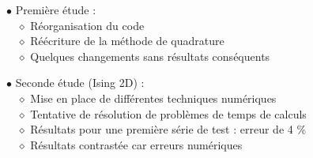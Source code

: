 \documentclass[9pt]{beamer}
\begin{document}
		\begin{frame}
	\justifying
	\vspace*{22pt}
	
	$\bullet$ Première étude : \\
	\vspace*{5pt}
		$\quad \diamond$ Réorganisation du code \\
		$\quad \diamond$ Réécriture de la méthode de quadrature \\
		$\quad \diamond$ Quelques changements sans résultats conséquents\\
	
	\vspace*{15pt}
	
	$\bullet$ Seconde étude (Ising 2D) : \\
		\vspace*{5pt}
	$\quad \diamond$ Mise en place de différentes techniques numériques\\
	$\quad \diamond$ Tentative de résolution de problèmes de temps de calculs\\
	$\quad \diamond$ Résultats pour une première série de test : erreur de 4 \%\\
	$\quad \diamond$ Résultats contrastée car erreurs numériques
	
	
	\end{frame}
	
	
\end{document}
